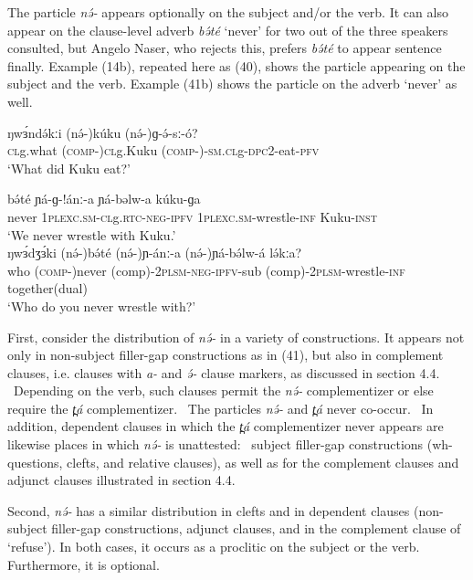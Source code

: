 The particle \textit{nə́-} appears optionally on the subject and/or the verb. It can also appear on the clause-level adverb \textit{bə́té} ‘never’ for two out of the three speakers consulted, but Angelo Naser, who rejects this, prefers \textit{bə́té} to appear sentence finally. Example (14b), repeated here as (40), shows the particle appearing on the subject and the verb.  Example (41b) shows the particle on the adverb ‘never’ as well.

\ea
\gll	ŋwɜ́ndə́kːi	(nə́-)kúku	(nə́-)ɡ-ə́-sː-ó?\\
	\textsc{cl}g.what	(\textsc{comp-})\textsc{cl}g.Kuku	(\textsc{comp-})-\textsc{sm.cl}g-\textsc{dpc}2-eat-\textsc{pfv}	\\
\trans	‘What did Kuku eat?’\\
\z

\ea
\ea \gll	bə́té	ɲá-ɡ-!ánː-a	ɲá-bəlw-a          	kúku-ɡa\\
	never   1\textsc{plexc.sm}-\textsc{cl}g.\textsc{rtc}-\textsc{neg}-\textsc{ipfv} 1\textsc{plexc.sm}-wrestle-\textsc{inf}	Kuku-\textsc{inst}\\
\trans		‘We never wrestle with Kuku.’\\
\ex \gll	ŋwɜ́dʒɜ́ki	(nə́-)bə́té	(nə́-)ɲ-ánː-a	 (nə́-)ɲá-bə́lw-á	lə́kːa?  	   \\
		    	who	        (\textsc{comp-})never     (comp)-2\textsc{plsm}-\textsc{neg}-\textsc{ipfv}-sub	
			(comp)-2\textsc{plsm}-wrestle-\textsc{inf}	together(dual)\\
\trans		‘Who do you never wrestle with?’
\z
\z

First, consider the distribution of \textit{nə́-} in a variety of constructions. It appears not only in non-subject filler-gap constructions as in (41), but also in complement clauses, i.e. clauses with \textit{a-} and \textit{ə́-} clause markers, as discussed in section 4.4.  Depending on the verb, such clauses permit the \textit{nə́-} complementizer or else require the \textit{t̪á} complementizer.  The particles \textit{nə́-} and \textit{t̪á} never co-occur.  In addition, dependent clauses in which the \textit{t̪á} complementizer never appears are likewise places in which \textit{nə́-} is unattested:  subject filler-gap constructions (wh-questions, clefts, and relative clauses), as well as for the complement clauses and adjunct clauses illustrated in section 4.4. 

Second, \textit{nə́-} has a similar distribution in clefts and in dependent clauses (non-subject filler-gap constructions, adjunct clauses, and in the complement clause of ‘refuse’). In both cases, it occurs as a proclitic on the subject or the verb. Furthermore, it is optional. 

